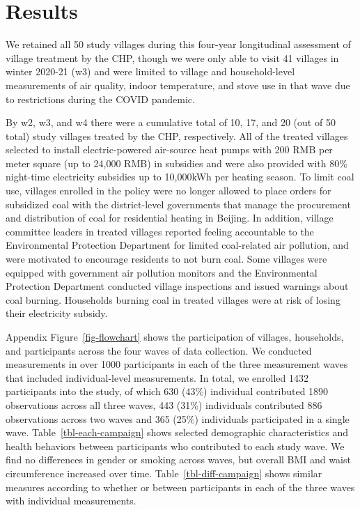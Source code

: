 \documentclass[
  letterpaper,
  DIV=11,
  numbers=noendperiod]{scrartcl}
\begin{document}
\section{Results}\label{results-1}

We retained all 50 study villages during this four-year longitudinal
assessment of village treatment by the CHP, though we were only able to
visit 41 villages in winter 2020-21 (w3) and were limited to village and
household-level measurements of air quality, indoor temperature, and
stove use in that wave due to restrictions during the COVID pandemic.

By w2, w3, and w4 there were a cumulative total of 10, 17, and 20 (out
of 50 total) study villages treated by the CHP, respectively. All of the
treated villages selected to install electric-powered air-source heat
pumps with 200 RMB per meter square (up to 24,000 RMB) in subsidies and
were also provided with 80\% night-time electricity subsidies up to
10,000kWh per heating season. To limit coal use, villages enrolled in
the policy were no longer allowed to place orders for subsidized coal
with the district-level governments that manage the procurement and
distribution of coal for residential heating in Beijing. In addition,
village committee leaders in treated villages reported feeling
accountable to the Environmental Protection Department for limited
coal-related air pollution, and were motivated to encourage residents to
not burn coal. Some villages were equipped with government air pollution
monitors and the Environmental Protection Department conducted village
inspections and issued warnings about coal burning. Households burning
coal in treated villages were at risk of losing their electricity
subsidy.

Appendix Figure~\ref{fig-flowchart} shows the participation of villages,
households, and participants across the four waves of data collection.
We conducted measurements in over 1000 participants in each of the three
measurement waves that included individual-level measurements. In total,
we enrolled 1432 participants into the study, of which 630 (43\%)
individual contributed 1890 observations across all three waves, 443
(31\%) individuals contributed 886 observations across two waves and 365
(25\%) individuals participated in a single wave.
Table~\ref{tbl-each-campaign} shows selected demographic characteristics
and health behaviors between participants who contributed to each study
wave. We find no differences in gender or smoking across waves, but
overall BMI and waist circumference increased over time.
Table~\ref{tbl-diff-campaign} shows similar measures according to
whether or between participants in each of the three waves with
individual measurements.
\end{document}
